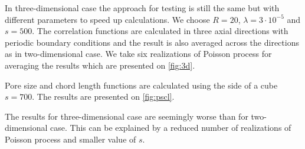 \documentclass[reprint,amsmath,amssymb,aps,pre]{revtex4-1}
\begin{document}
In three-dimensional case the approach for testing is still the same but with
different parameters to speed up calculations. We choose $R = 20$,
$\lambda = 3\cdot10^{-5}$ and $s = 500$. The correlation functions are
calculated in three axial directions with periodic boundary conditions and the
result is also averaged across the directions as in two-dimensional
case. We take six realizations of Poisson process for averaging the results
which are presented on \cref{fig:3d}.

Pore size and chord length functions are calculated using the side of a cube
$s = 700$. The results are presented on \cref{fig:pscl}.

The results for three-dimensional case are seemingly worse than for
two-dimensional case. This can be explained by a reduced number of realizations
of Poisson process and smaller value of $s$.
\end{document}
